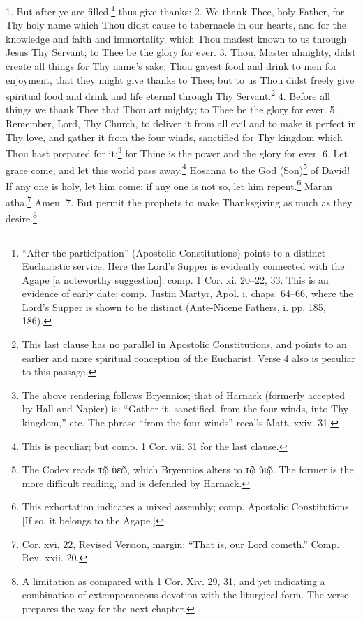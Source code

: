 1. But after ye are filled,\footnote{\par  “After the participation” (Apostolic Constitutions) points to a distinct Eucharistic service. Here the Lord’s Supper is evidently connected with the Agape [a noteworthy suggestion]; comp. 1 Cor. xi. 20–22, 33. This is an evidence of early date; comp. Justin Martyr, Apol. i. chaps. 64–66, where the Lord’s Supper is shown to be distinct (Ante-Nicene Fathers, i. pp. 185, 186).} thus give thanks: 2. We thank Thee, holy Father, for Thy holy name which Thou didst cause to tabernacle in our hearts, and for the knowledge and faith and immortality, which Thou madest known to us through Jesus Thy Servant; to Thee be the glory for ever. 3. Thou, Master almighty, didst create all things for Thy name’s sake; Thou gavest food and drink to men for enjoyment, that they might give thanks to Thee; but to us Thou didst freely give spiritual food and drink and life eternal through Thy Servant.\footnote{\par  This last clause has no parallel in Apostolic Constitutions, and points to an earlier and more spiritual conception of the Eucharist. Verse 4 also is peculiar to this passage.} 4. Before all things we thank Thee that Thou art mighty; to Thee be the glory for ever. 5. Remember, Lord, Thy Church, to deliver it from all evil and to make it perfect in Thy love, and gather it from the four winds, sanctified for Thy kingdom which Thou hast prepared for it;\footnote{\par  The above rendering follows Bryennios; that of Harnack (formerly accepted by Hall and Napier) is: “Gather it, sanctified, from the four winds, into Thy kingdom,” etc. The phrase “from the four winds” recalls Matt. xxiv. 31.} for Thine is the power and the glory for ever. 6. Let grace come, and let this world pass away.\footnote{\par  This is peculiar; but comp. 1 Cor. vii. 31 for the last clause.} Hosanna to the God (Son)\footnote{\par  The Codex reads \textgreek{τῷ ὺεῷ}, which Bryennios alters to \textgreek{τῷ ὺιῷ}. The former is the more difficult reading, and is defended by Harnack.} of David! If any one is holy, let him come; if any one is not so, let him repent.\footnote{\par  This exhortation indicates a mixed assembly; comp. Apostolic Constitutions. [If so, it belongs to the Agape.]} Maran atha.\footnote{\par  Cor. xvi. 22, Revised Version, margin: “That is, our Lord cometh.” Comp. Rev. xxii. 20.} Amen. 7. But permit the prophets to make Thanksgiving as much as they desire.\footnote{\par  A limitation as compared with 1 Cor. Xiv. 29, 31, and yet indicating a combination of extemporaneous devotion with the liturgical form. The verse prepares the way for the next chapter.}

